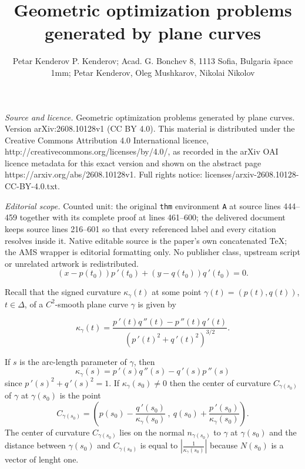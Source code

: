 \documentclass[10pt,a4paper]{amsart}
\def\g{\gamma}
\begin{document}
\title[Geometric optimization problems generated by plane curves]{Geometric optimization problems generated by plane curves}
\author{Petar Kenderov P. Kenderov; Acad. G. Bonchev 8, 1113 Sofia, Bulgaria špace 1mm; Petar Kenderov, Oleg Mushkarov, Nikolai Nikolov}
\date{}
\maketitle
\noindent\emph{Source and licence.} Geometric optimization problems generated by plane curves. Version arXiv:2608.10128v1 (CC BY 4.0). This material is distributed under the Creative Commons Attribution 4.0 International licence, http://creativecommons.org/licenses/by/4.0/, as recorded in the arXiv OAI licence metadata for this exact version and shown on the abstract page https://arxiv.org/abs/2608.10128v1. Full rights notice: licenses/arxiv-2608.10128-CC-BY-4.0.txt.\par\smallskip
\noindent\textit{Editorial scope.} Counted unit: the original \texttt{thm} environment \texttt{A} at source lines 444--459 together with its complete proof at lines 461--600; the delivered document keeps source lines 216--601 so that every referenced label and every citation resolves inside it. Native editable source is the paper's own concatenated TeX; the AMS wrapper is editorial formatting only. No publisher class, upstream script or unrelated artwork is redistributed.
\begin{equation}\label{normala}
(x - p(t_0))p\,'(t_0) + (y - q(t_0))q\,'(t_0) = 0.
\end{equation}

Recall that the signed curvature $\kappa_{\g}(t)$ at some point $\g(t)=(p(t),q(t))$, $t \in \Delta$, of a $C^2$-smooth
plane curve  $\g$  is given by

\begin{equation}\label{1}
\kappa_{\g}(t)=\frac{p\,'(t)q\,''(t)-p\,''(t)q\,'(t)}{(p\,'(t)^2+q\,'(t)^2)^{3/2}} .
\end{equation}


If $s$ is the arc-length parameter of $\g$, then
\begin{equation}\label{2}
\kappa_{\g}(s)=p\,'(s)q\,''(s)-q\,'(s)p\,''(s)
\end{equation}
since $p\,'(s)^2+q\,'(s)^2=1$. If
$\kappa_{\g}(s_0)\neq 0$ then the center of
curvature $C_{\g(s_0)}$ of $\g$ at $\g(s_0)$ is the point
\begin{equation}\label{3}
C_{\g(s_0)}=(p(s_0)-\frac{q\,'(s_0)}{\kappa_{\g}(s_0)} \ , \
q(s_0)+\frac{p\,'(s_0)}{\kappa_{\g}(s_0)}).
\end{equation}
The center of curvature $C_{\g(s_0)}$ lies on the normal $n_{\g(s_0)}$ to $\g$ at
$\g(s_0)$ and the distance between $\g(s_0)$
and $C_{\g(s_0)}$ is equal to $|\frac{1}
{\kappa_{\g }(s_0)}|$ because $N(s_0)$ is a vector of lenght one.
\end{document}
